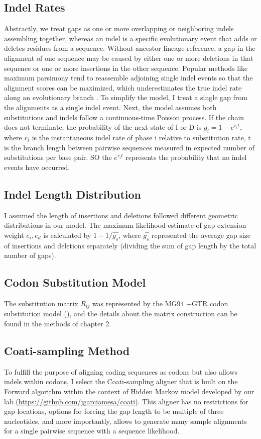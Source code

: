 \subsection{Indel Rates}
Abstractly, we treat gaps as one or more overlapping or neighboring indels assembling together, whereas an indel is a specific evolutionary event that adds or deletes residues from a sequence. Without ancestor lineage reference, a gap in the alignment of one sequence may be caused by either one or more deletions in that sequence or one or more insertions in the other sequence. Popular methods like maximum parsimony tend to reassemble adjoining single indel events so that the alignment scores can be maximized, which underestimates the true indel rate along an evolutionary branch \citeauthor{knudsen2003sequence}. To simplify the model, I treat a single gap from the alignments as a single indel event. Next, the model assumes both substitutions and indels follow a continuous-time Poisson process. If the chain does not terminate, the probability of the next state of I or D is $g_i = 1-e^{r_i t}$, where $r_i$ is the instantaneous indel rate of phase i relative to substitution rate, t is the branch length between pairwise sequences measured in expected number of  substitutions per base pair. SO the $e^{r_i t}$ represents the probability that no indel events have occurred.

\subsection{Indel Length Distribution}
I assumed the length of insertions and deletions followed different geometric distributions in our model. The maximum likelihood estimate of gap extension weight $e_i, e_d$ is calculated by $ 1-1/\hat{g_s}$, where $\hat{g_s}$ represented the average gap size of insertions and deletions separately (dividing the sum of gap length by the total number of gaps).   

\subsection{Codon Substitution Model}
The substitution matrix $R_{ij}$ was represented by the MG94 +GTR codon substitution model (\cite{muse1994likelihood, tavare1986some}), and the details about the matrix construction can be found in the methods of chapter 2. 

\subsection{Coati-sampling Method}
To fulfill the purpose of aligning coding sequences as codons but also allows indels within codons, I select the Coati-sampling aligner that is built on the Forward algorithm within the context of Hidden Markov model developed by our lab (\href{https://github.com/jgarciamesa/coati}{https://github.com/jgarciamesa/coati}). This aligner has no restrictions for gap locations, options for forcing the gap length to be multiple of three nucleotides, and more importantly, allows to generate many sample alignments for a single pairwise sequence with a sequence likelihood.  

